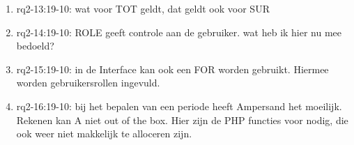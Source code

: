 \begin{enumerate}
    \item rq2-13:19-10: wat voor TOT geldt, dat geldt ook voor SUR
    \item rq2-14:19-10: ROLE geeft controle aan de gebruiker. wat heb ik hier nu mee bedoeld?
    \item rq2-15:19-10: in de Interface kan ook een FOR worden gebruikt. Hiermee worden gebruikersrollen ingevuld.
    \item rq2-16:19-10: bij het bepalen van een periode heeft Ampersand het moeilijk. Rekenen kan A niet out of the box. Hier zijn de PHP functies voor nodig, die ook weer niet makkelijk te alloceren zijn.
\end{enumerate}
